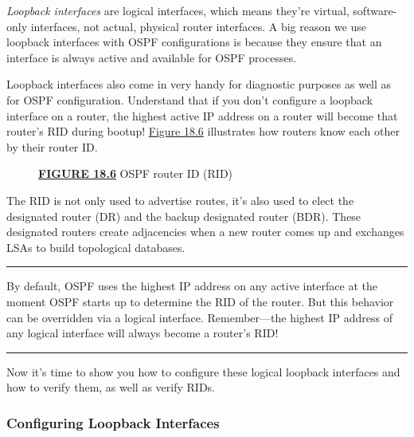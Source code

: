 \emph{Loopback interfaces} are logical interfaces, which means they're
virtual, software-only interfaces, not actual, physical router
interfaces. A big reason we use loopback interfaces with OSPF
configurations is because they ensure that an interface is always active
and available for OSPF processes.

Loopback interfaces also come in very handy for diagnostic purposes as
well as for OSPF configuration. Understand that if you don't configure a
loopback interface on a router, the highest active IP address on a
router will become that router's RID during bootup!
\protect\hyperlink{c18.xhtmlux5cux23figure18-6}{Figure 18.6} illustrates
how routers know each other by their router ID.

\begin{figure}
\centering
\caption{{\protect\hyperlink{c18.xhtmlux5cux23figureanchor18-6}{\textbf{FIGURE
18.6}} OSPF router ID (RID)}}
\end{figure}

The RID is not only used to advertise routes, it's also used to elect
the designated router (DR) and the backup designated router (BDR). These
designated routers create adjacencies when a new router comes up and
exchanges LSAs to build topological databases.

\begin{center}\rule{0.5\linewidth}{0.5pt}\end{center}

By default, OSPF uses the highest IP
address on any active interface at the moment OSPF starts up to
determine the RID of the router. But this behavior can be overridden via
a logical interface. Remember---the highest IP address of any logical
interface will always become a router's RID!

\begin{center}\rule{0.5\linewidth}{0.5pt}\end{center}

\protect\hypertarget{c18.xhtmlux5cux23Page_763}{}{}Now it's time to show
you how to configure these logical loopback interfaces and how to verify
them, as well as verify RIDs.

\subsubsection[Configuring Loopback
Interfaces]{\texorpdfstring{\protect\hypertarget{c18.xhtmlux5cux23c18-sec-10}{}{}Configuring
Loopback Interfaces}{Configuring Loopback Interfaces}}

